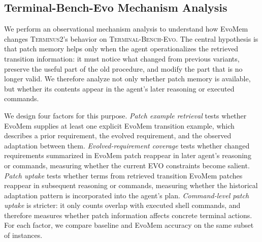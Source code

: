 \documentclass{llmxive}
\begin{document}
\subsection{Terminal-Bench-Evo Mechanism Analysis}
\label{sec:terminal_pm_mechanism}

We perform an observational mechanism analysis to understand how EvoMem changes \textsc{Terminus2}'s behavior on \textsc{Terminal-Bench-Evo}. The central hypothesis is that patch memory helps only when the agent operationalizes the
  retrieved transition information: it must notice what changed from previous variants, preserve the useful part of the old procedure, and modify the part that is no longer valid. We therefore analyze not only
  whether patch memory is available, but whether its contents appear in the agent's later reasoning or executed commands.
  
We design four factors for this purpose. \emph{Patch example retrieval} tests whether EvoMem supplies at least one explicit EvoMem transition example, which describes a prior requirement, the evolved requirement, and the observed adaptation between them. \emph{Evolved-requirement coverage} tests whether changed requirements summarized in EvoMem patch reappear in later agent's reasoning or commands, measuring whether the current EVO constraints become salient. \emph{Patch uptake} tests whether terms from retrieved transition EvoMem patches reappear in subsequent reasoning or commands, measuring whether the historical adaptation pattern is incorporated into the agent's plan. \emph{Command-level patch uptake} is stricter: it only counts overlap with executed shell commands, and therefore measures whether patch information affects concrete terminal actions. 
For each factor, we compare baseline and EvoMem accuracy on the same subset of instances. 
\end{document}
